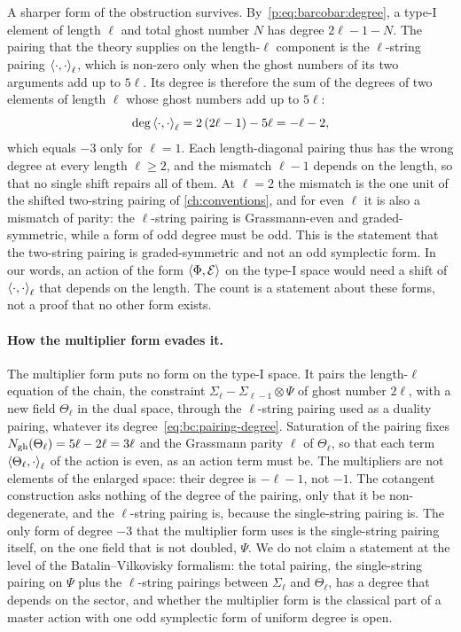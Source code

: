 A sharper form of the obstruction survives.
By~\eqref{p:eq:barcobar:degree}, a type-I element of length $\ell$ and total ghost number $N$ has degree $2 \ell - 1 - N$.
The pairing that the theory supplies on the length-$\ell$ component is the $\ell$-string pairing $\pair[\ell]{\cdot}{\cdot}$, which is non-zero only when the ghost numbers of its two arguments add up to $5 \ell$.
Its degree is therefore the sum of the degrees of two elements of length $\ell$ whose ghost numbers add up to $5 \ell$:
\begin{equation}
  \label{eq:bc:pairing-degree}
  \deg \pair[\ell]{\cdot}{\cdot}
    = 2 \, (2 \ell - 1) - 5 \ell
    = - \ell - 2,
\end{equation}
which equals $-3$ only for $\ell = 1$.
Each length-diagonal pairing thus has the wrong degree at every length $\ell \ge 2$, and the mismatch $\ell - 1$ depends on the length, so that no single shift repairs all of them.
At $\ell = 2$ the mismatch is the one unit of the shifted two-string pairing of \cref{ch:conventions}, and for even $\ell$ it is also a mismatch of parity: the $\ell$-string pairing is Grassmann-even and graded-symmetric, while a form of odd degree must be odd.
This is the statement that the two-string pairing is graded-symmetric and not an odd symplectic form.
In our words, an action of the form $\pair{\Phi}{\mathcal E}$ on the type-I space would need a shift of $\pair[\ell]{\cdot}{\cdot}$ that depends on the length.
The count is a statement about these forms, not a proof that no other form exists.

\paragraph{How the multiplier form evades it.}
The multiplier form puts no form on the type-I space.
It pairs the length-$\ell$ equation of the chain, the constraint $\Sigma_\ell - \Sigma_{\ell - 1} \otimes \Psi$ of ghost number $2 \ell$, with a new field $\Theta_\ell$ in the dual space, through the $\ell$-string pairing used as a duality pairing, whatever its degree~\eqref{eq:bc:pairing-degree}.
Saturation of the pairing fixes $\Ngh(\Theta_\ell) = 5 \ell - 2 \ell = 3 \ell$ and the Grassmann parity $\ell$ of $\Theta_\ell$, so that each term $\pair[\ell]{\Theta_\ell}{\cdot}$ of the action is even, as an action term must be.
The multipliers are not elements of the enlarged space: their degree is $- \ell - 1$, not $-1$.
The cotangent construction asks nothing of the degree of the pairing, only that it be non-degenerate, and the $\ell$-string pairing is, because the single-string pairing is.
The only form of degree $-3$ that the multiplier form uses is the single-string pairing itself, on the one field that is not doubled, $\Psi$.
We do not claim a statement at the level of the Batalin--Vilkovisky formalism: the total pairing, the single-string pairing on $\Psi$ plus the $\ell$-string pairings between $\Sigma_\ell$ and $\Theta_\ell$, has a degree that depends on the sector, and whether the multiplier form is the classical part of a master action with one odd symplectic form of uniform degree is open.

